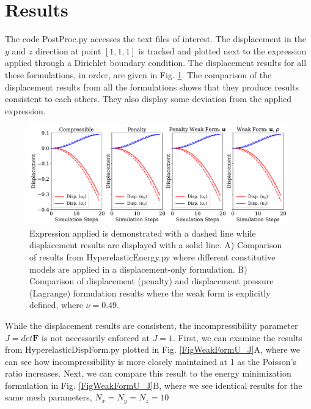 \documentclass[12pt,3p]{article}
\begin{document}
\section{Results}
\vspace{-2ex}
The code {\selectfont PostProc.py} accesses the text files of interest. The displacement in the $y$ and $z$ direction at point $[1,1,1]$ is tracked and plotted next to the expression applied through a Dirichlet boundary condition. The displacement results for all these formulations, in order, are given in Fig. \ref{FigFormComparison}. The comparison of the displacement results from all the formulations shows that they produce results consistent to each others. They also display some deviation from the applied expression.

\begin{figure}[!htb]
\centering
\includegraphics[width=\textwidth]{./Images/FormComp_Disp_Nu_049}
\caption{Expression applied is demonstrated with a dashed line while displacement results are displayed with a solid line. A) Comparison of results from HyperelasticEnergy.py where different constitutive models are applied in a displacement-only formulation. B) Comparison of displacement (penalty) and displacement pressure (Lagrange) formulation results where the weak form is explicitly defined, where $\nu = 0.49$.}
\label{FigFormComparison}
\end{figure}

While the displacement results are consistent, the incompressibility parameter $J=det \mathbf{F}$ is not necessarily enforced at $J=1$. First, we can examine the results from {\selectfont HyperelasticDispForm.py} plotted in Fig. \ref{FigWeakFormU_J}A, where we can see how incompressibility is more closely maintained at 1 as the Poisson's ratio increases. Next, we can compare this result to the energy minimization formulation in Fig. \ref{FigWeakFormU_J}B, where we see identical results for the same mesh parameters, $N_x = N_y = N_z = 10$
\end{document}
